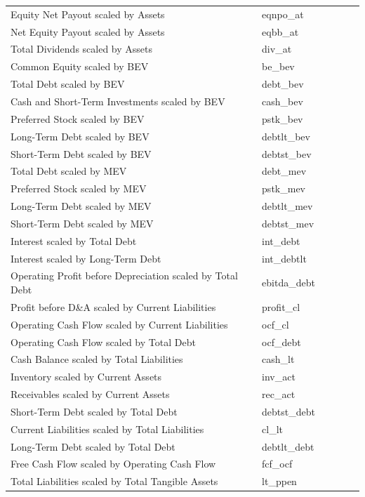 \documentclass[12pt,title,fleqn]{article}
\begin{document}
\begin{longtable}{p{5cm}p{2cm}p{5cm}lll}
Equity Net Payout scaled by Assets & eqnpo\_at & & & & \\
Net Equity Payout scaled by Assets & eqbb\_at & & & & \\
Total Dividends scaled by Assets & div\_at & & & & \\
Common Equity scaled by BEV & be\_bev & & & & \\
Total Debt scaled by BEV & debt\_bev & & & & \\
Cash and Short-Term Investments scaled by BEV & cash\_bev & & & & \\
Preferred Stock scaled by BEV & pstk\_bev & & & & \\
Long-Term Debt scaled by BEV & debtlt\_bev & & & & \\
Short-Term Debt scaled by BEV & debtst\_bev & & & & \\
Total Debt scaled by MEV & debt\_mev & & & & \\
Preferred Stock scaled by MEV & pstk\_mev & & & & \\
Long-Term Debt scaled by MEV & debtlt\_mev & & & & \\
Short-Term Debt scaled by MEV & debtst\_mev & & & & \\
Interest scaled by Total Debt & int\_debt & & & & \\
Interest scaled by Long-Term Debt & int\_debtlt & & & & \\
Operating Profit before Depreciation scaled by Total Debt & ebitda\_debt & & & & \\
Profit before D\&A scaled by Current Liabilities & profit\_cl & & & & \\
Operating Cash Flow scaled by Current Liabilities & ocf\_cl & & & & \\
Operating Cash Flow scaled by Total Debt & ocf\_debt & & & & \\
Cash Balance scaled by Total Liabilities & cash\_lt & & & & \\
Inventory scaled by Current Assets & inv\_act & & & & \\
Receivables scaled by Current Assets & rec\_act & & & & \\
Short-Term Debt scaled by Total Debt & debtst\_debt & & & & \\
Current Liabilities scaled by Total Liabilities & cl\_lt & & & & \\
Long-Term Debt scaled by Total Debt & debtlt\_debt & & & & \\
Free Cash Flow scaled by Operating Cash Flow & fcf\_ocf & & & & \\
Total Liabilities scaled by Total Tangible Assets & lt\_ppen & & & & \\

\end{longtable}
\end{document}
